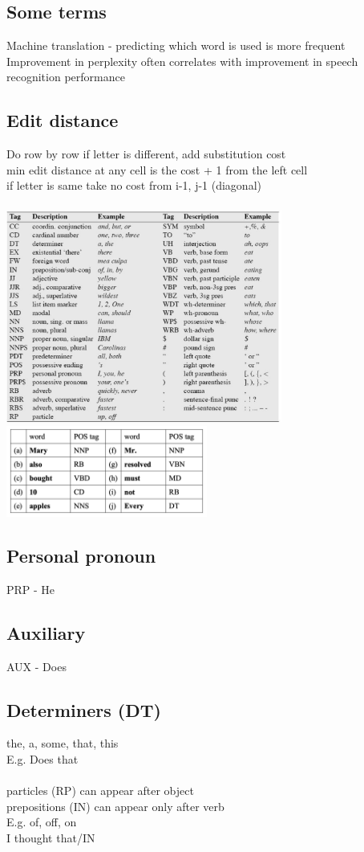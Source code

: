\documentclass[11pt]{article}
\begin{document}
\setlength{\columnsep}{1cm}
\begin{multicols*}{3}
\subsection*{Some terms}
Machine translation - predicting which word is used is more frequent \\
 Improvement in perplexity often correlates with improvement in speech recognition performance
\subsection*{Edit distance}
Do row by row
if letter is different, add substitution cost\\
min edit distance at any cell is the cost + 1 from the left cell \\
if letter is same take no cost from i-1, j-1 (diagonal)
\\\\
\includegraphics[height=7cm]{images/w.png}
\\
\includegraphics[height=3cm]{images/w1.png}
\subsection*{Personal pronoun}
PRP - He
\subsection*{Auxiliary}
AUX - Does
\subsection*{Determiners (DT)}
the, a, some, that, this\\
E.g. Does that\\\\
particles (RP) can appear after object\\
prepositions (IN) can appear only after verb \\
E.g. of, off, on\\
I thought that/IN

\end{multicols*}
\end{document}
